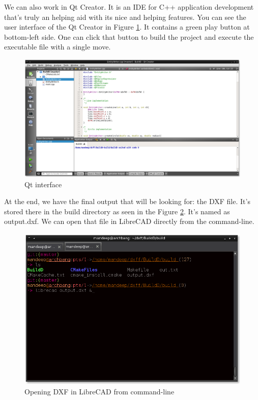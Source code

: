 \noindent We can also work in Qt Creator. It is an IDE for C++ application development that's truly an helping aid with its nice and helping features. You can see the user interface of the Qt Creator in Figure \ref{fig:qt}. It contains a green play button at bottom-left side. One can click that button to build the project and execute the executable file with a single move.\\

\begin{figure}
\centering
\includegraphics[scale=0.38]{images/bld2.png}
\caption{Qt interface}
\label{fig:qt}
\end{figure}

\noindent At the end, we have the final output that will be looking for: the DXF file. It's stored there in the build directory as seen in the Figure \ref{fig:dxf}. It's named as output.dxf. We can open that file in LibreCAD directly from the command-line.\\


\begin{figure}
\centering
\includegraphics[scale=0.5]{images/bld4.png}
\caption{Opening DXF in LibreCAD from command-line}
\label{fig:dxf}
\end{figure}

